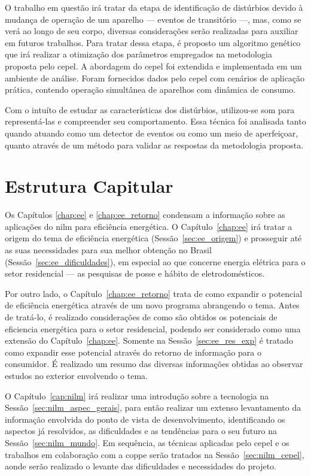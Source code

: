 O trabalho em questão irá tratar da etapa de identificação de
distúrbios devido à mudança de operação de um aparelho --- eventos de
transitório ---, mas, como se verá ao longo de seu corpo, diversas
considerações serão realizadas para auxiliar em futuros trabalhos.
Para tratar dessa etapa, é proposto um algoritmo genético que irá
realizar a otimização dos parâmetros empregados na metodologia
proposta pelo \acs{cepel}. A abordagem do \acs{cepel} foi extendida e
implementada em um ambiente de análise. Foram fornecidos dados pelo
\acs{cepel} com cenários de aplicação prática, contendo operação
simultânea de aparelhos com dinâmica de consumo.

Com o intuíto de estudar as características dos distúrbios,
utilizou-se \gls{som} para representá-las e compreender seu
comportamento. Essa técnica foi analisada tanto quando atuando como um
detector de eventos ou como um meio de aperfeiçoar, quanto através de
um método para validar as respostas da metodologia proposta.

\section{Estrutura Capitular}

Os Capítulos \ref{chap:ee} e \ref{chap:ee_retorno} condensam a
informação sobre as aplicações do \acs{nilm} para eficiência
energética. O Capítulo~\ref{chap:ee} irá tratar a origem do tema de
eficiência energética (Sessão~\ref{sec:ee_origem}) e prosseguir até as
suas necessidades para sua melhor obtenção no Brasil
(Sessão~\ref{sec:ee_dificuldades}), em especial ao que concerne
energia elétrica para o setor residencial --- as pesquisas de posse e
hábito de eletrodomésticos.

Por outro lado, o Capítulo~\ref{chap:ee_retorno} trata de como
expandir o potencial de eficiência energética através de um novo
programa abrangendo o tema. Antes de tratá-lo, é realizado
considerações de como são obtidos os potenciais de eficiencia
energética para o setor residencial, podendo ser considerado como uma
extensão do Capítulo~\ref{chap:ee}. Somente na
Sessão~\ref{sec:ee_res_exp} é tratado como expandir esse potencial
através do retorno de informação para o consumidor. É realizado um
resumo das diversas informações obtidas ao observar estudos no
exterior envolvendo o tema.

O Capítulo~\ref{cap:nilm} irá realizar uma introdução sobre a
tecnologia na Sessão~\ref{sec:nilm_aspec_gerais}, para então realizar
um extenso levantamento da informação envolvida do ponto de vista de
desenvolvimento, identificando os aspectos já resolvidos, as
dificuldades e as tendências para o seu futuro na
Sessão~\ref{sec:nilm_mundo}. Em sequência, as técnicas aplicadas pelo
\acs{cepel} e os trabalhos em colaboração com a \acs{coppe} serão
tratados na Sessão~\ref{sec:nilm_cepel}, aonde serão realizado o
levante das dificuldades e necessidades do projeto.


